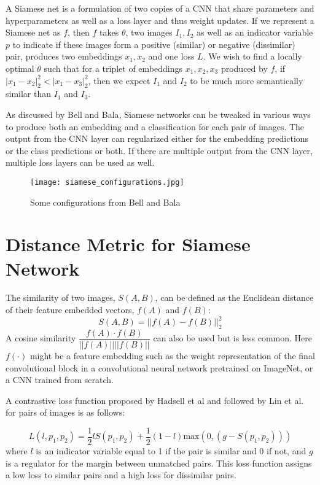 A Siamese net is a formulation of two copies of a CNN that share parameters and hyperparameters as well as a loss layer and thus weight updates. If we represent a Siamese net as $f$, then $f$ takes $\theta$, two images $I_1, I_2$ as well as an indicator variable $p$ to indicate if these images form a positive (similar) or negative (dissimilar) pair, produces two embeddings $x_1, x_2$ and one loss $L$. We wish to find a locally optimal $\theta$ such that for a triplet of embeddings $x_1, x_2, x_3$ produced by $f$, if $|x_1 - x_2|_2^2 < |x_1 - x_3|_2^2$, then we expect $I_1$ and $I_2$ to be much more semantically similar than $I_1$ and $I_3$.

As discussed by Bell and Bala\cite{bell2015learning}, Siamese networks can be tweaked in various ways to produce both an embedding and a classification for each pair of images. The output from the CNN layer can regularized either for the embedding predictions or the class predictions or both. If there are multiple output from the CNN layer, multiple loss layers can be used as well.

\begin{figure}[!htbp]
  \label{fig:siamese_configurations}
  \centering
  \texttt{[image: siamese\_configurations.jpg]}
  \caption{Some configurations from Bell and Bala}
\end{figure}


\section{Distance Metric for Siamese Network}
The similarity of two images, $S(A,B)$, can be defined as the Euclidean distance of their feature embedded vectors, $f(A)$ and $f(B)$:
\begin{equation}
	S(A,B) = ||f(A) - f(B)||_2^2
\end{equation}
A cosine similarity $\dfrac{f(A) \cdot f(B)}{||f(A)||||f(B)||}$ can also be used but is less common. Here $f(\cdot)$ might be a feature embedding such as the weight representation of the final convolutional block in a convolutional neural network pretrained on ImageNet, or a CNN trained from scratch.

A contrastive loss function proposed by Hadsell et al and followed by Lin et al. for pairs of images is as follows:

\begin{equation}
	L(l, p_1, p_2) = \dfrac{1}{2}lS(p_1, p_2) + \dfrac{1}{2}(1-l)\text{max}(0, (g-S(p_1,p_2)))
\end{equation}
where $l$ is an indicator variable equal to 1 if the pair is similar and 0 if not, and $g$ is a regulator for the margin between unmatched pairs.\cite{hadsell2006dimensionality}\cite{lin2015learning} This loss function assigns a low loss to similar pairs and a high loss for dissimilar pairs. 

